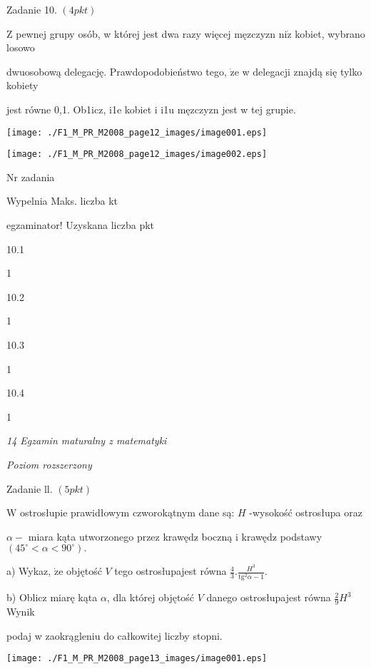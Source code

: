 \documentclass[a4paper,12pt]{article}
\begin{document}
Zadanie 10. $(4pkt)$

$\mathrm{Z}$ pewnej grupy osób, w której jest dwa razy więcej męzczyzn $\mathrm{n}\mathrm{i}\dot{\mathrm{z}}$ kobiet, wybrano losowo

dwuosobową delegację. Prawdopodobieństwo tego, $\dot{\mathrm{z}}\mathrm{e}$ w delegacji znajdą się tylko kobiety

jest równe 0,1. Ob1icz, i1e kobiet i i1u męzczyzn jest w tej grupie.
\begin{center}
\texttt{[image: ./F1\_M\_PR\_M2008\_page12\_images/image001.eps]}

\texttt{[image: ./F1\_M\_PR\_M2008\_page12\_images/image002.eps]}
\end{center}
Nr zadania

Wypelnia Maks. liczba kt

egzaminator! Uzyskana liczba pkt

10.1

1

10.2

1

10.3

1

10.4

1





{\it 14 Egzamin maturalny z matematyki}

{\it Poziom rozszerzony}

Zadanie ll. $(5pkt)$

$\mathrm{W}$ ostrosłupie prawidłowym czworokątnym dane są: $H$ -wysokość ostrosłupa oraz

$\alpha-$ miara kąta utworzonego przez krawędz$\acute{}$ boczną i krawędz$\acute{}$ podstawy $(45^{\circ}<\alpha<90^{\circ}).$

a) Wykaz, $\dot{\mathrm{z}}\mathrm{e}$ objętość $V$ tego ostrosłupajest równa $\displaystyle \frac{4}{3}.\frac{H^{3}}{\mathrm{t}\mathrm{g}^{2}\alpha-1}.$

b) Oblicz miarę kąta $\alpha$, dla której objętość $V$ danego ostrosłupajest równa $\displaystyle \frac{2}{9}H^{3}$ Wynik

podaj w zaokrągleniu do całkowitej liczby stopni.
\begin{center}
\texttt{[image: ./F1\_M\_PR\_M2008\_page13\_images/image001.eps]}
\end{center}
\end{document}
